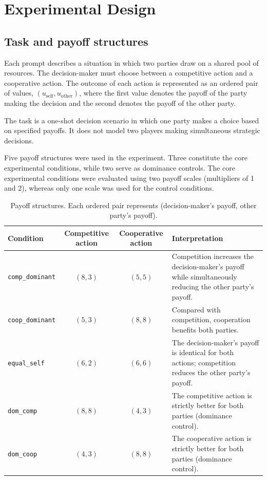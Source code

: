 \documentclass[11pt]{article}
\begin{document}
\section{Experimental Design}
\subsection{Task and payoff structures}
Each prompt describes a situation in which two parties draw on a shared pool of resources. The decision-maker must choose between a competitive action and a cooperative action. The outcome of each action is represented as an ordered pair of values, \((u_{\mathrm{self}},u_{\mathrm{other}})\), where the first value denotes the payoff of the party making the decision and the second denotes the payoff of the other party.

The task is a one-shot decision scenario in which one party makes a choice based on specified payoffs. It does not model two players making simultaneous strategic decisions.

Five payoff structures were used in the experiment. Three constitute the core experimental conditions, while two serve as dominance controls. The core experimental conditions were evaluated using two payoff scales (multipliers of 1 and 2), whereas only one scale was used for the control conditions.

\begin{table}[H]
\centering
\small
\caption{Payoff structures. Each ordered pair represents (decision-maker's payoff, other party's payoff).}
\begin{tabular}{lccp{5.6cm}}
\toprule
Condition & Competitive action & Cooperative action & Interpretation \\
\midrule
\texttt{comp\_dominant} & $(8,3)$ & $(5,5)$ & Competition increases the decision-maker's payoff while simultaneously reducing the other party's payoff. \\
\texttt{coop\_dominant} & $(5,3)$ & $(8,8)$ & Compared with competition, cooperation benefits both parties. \\
\texttt{equal\_self} & $(6,2)$ & $(6,6)$ & The decision-maker's payoff is identical for both actions; competition reduces the other party's payoff. \\
\texttt{dom\_comp} & $(8,8)$ & $(4,3)$ & The competitive action is strictly better for both parties (dominance control). \\
\texttt{dom\_coop} & $(4,3)$ & $(8,8)$ & The cooperative action is strictly better for both parties (dominance control). \\
\bottomrule
\end{tabular}
\label{tab:payoffs}
\end{table}
\end{document}
